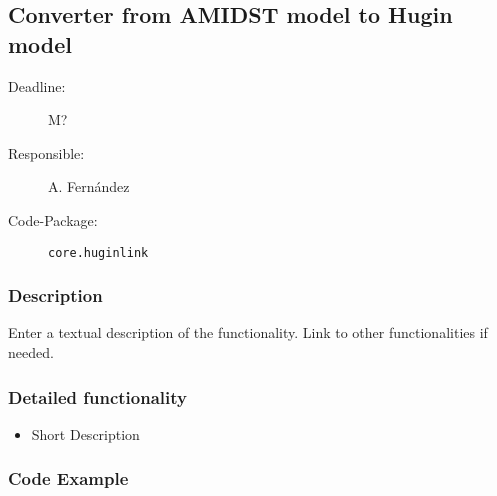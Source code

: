 \newpage
\subsection{Converter from AMIDST model to Hugin model}
\label{ConverterToAMIDST}

\begin{description}
\item[Deadline:] M?
\item[Responsible:] A. Fern\'andez
\item[Code-Package:] \texttt{core.huginlink}
\end{description}

\subsubsection*{Description}

Enter a textual description of the functionality. Link to other functionalities if needed. 


\subsubsection*{Detailed functionality}

\begin{itemize}
\item Short Description
\end{itemize}


\subsubsection*{Code Example}
